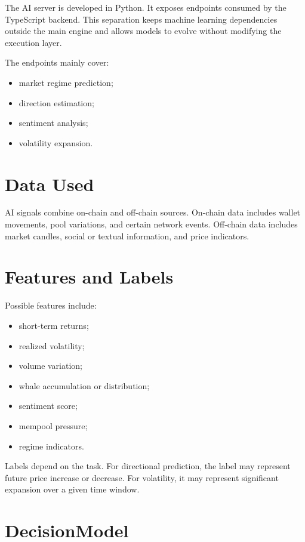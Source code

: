 \documentclass[12pt,a4paper]{report}
\begin{document}
The AI server is developed in Python. It exposes endpoints consumed by the TypeScript backend. This separation keeps machine learning dependencies outside the main engine and allows models to evolve without modifying the execution layer.

The endpoints mainly cover:
\begin{itemize}
    \item market regime prediction;
    \item direction estimation;
    \item sentiment analysis;
    \item volatility expansion.
\end{itemize}

\section{Data Used}

AI signals combine on-chain and off-chain sources. On-chain data includes wallet movements, pool variations, and certain network events. Off-chain data includes market candles, social or textual information, and price indicators.

\section{Features and Labels}

Possible features include:
\begin{itemize}
    \item short-term returns;
    \item realized volatility;
    \item volume variation;
    \item whale accumulation or distribution;
    \item sentiment score;
    \item mempool pressure;
    \item regime indicators.
\end{itemize}

Labels depend on the task. For directional prediction, the label may represent future price increase or decrease. For volatility, it may represent significant expansion over a given time window.

\section{DecisionModel}
\end{document}
